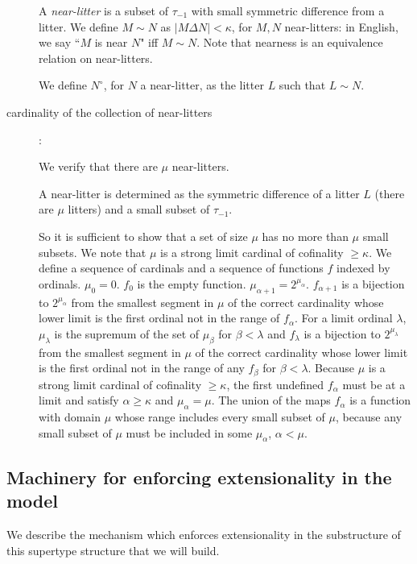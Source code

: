 \documentclass[112pt]{article}
\begin{document}
\begin{description}
A {\em near-litter\/} is a subset of $\tau_{-1}$ with small symmetric difference from a litter.  We define $M \sim N$ as $|M \Delta N|<\kappa$, for $M,N$ near-litters:  in English, we say ``$M$ is near $N$" iff $M \sim N$.  Note that nearness is an equivalence relation on near-litters.  

We define $N^\circ$, for $N$ a near-litter, as the litter $L$ such that $L \sim N$.  


\item[cardinality of the collection of near-litters]:

 We verify that there are $\mu$ near-litters.

A near-litter is determined as the symmetric difference of a litter $L$ (there are $\mu$ litters) and a small subset of
$\tau_{-1}$.

So it is sufficient to show that a set of size $\mu$ has no more than $\mu$ small subsets.  We note that $\mu$ is
a strong limit cardinal of cofinality $\geq\kappa$.  We define a sequence of cardinals and a sequence of functions $f$ indexed by ordinals.
$\mu_0 = 0$.  $f_0$ is the empty function.  $\mu_{\alpha+1}=2^{\mu_\alpha}$.  $f_{\alpha+1}$ is a bijection
to $2^{\mu_\alpha}$ from the smallest segment in $\mu$ of the correct cardinality whose lower limit is the first ordinal not in the range of $f_{\alpha}$.  For a limit ordinal $\lambda$, $\mu_{\lambda}$ is the supremum of the set of
$\mu_\beta$ for $\beta<\lambda$ and $f_{\lambda}$ is a bijection to $2^{\mu_\lambda}$ from the smallest
segment in $\mu$ of the correct cardinality whose lower limit is the first ordinal not in the range of any
$f_\beta$ for $\beta<\lambda$.   Because $\mu$ is a strong limit cardinal of cofinality $\geq \kappa$, the first undefined $f_\alpha$ must be at a limit and satisfy $\alpha \geq \kappa$ and $\mu_\alpha = \mu$.   The union of the maps $f_\alpha$ is a function with domain $\mu$ whose range includes every small subset of $\mu$, because any small subset of $\mu$ must be included in some $\mu_\alpha$, $\alpha<\mu$.


\end{description}



\subsection{Machinery for enforcing extensionality in the model}
  We describe the mechanism which enforces extensionality in the substructure of this supertype structure that we will build.
\end{document}

